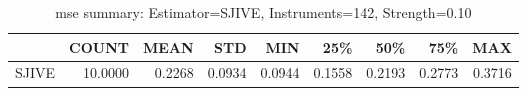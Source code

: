 \begin{table}[ht]
\centering
\caption{mse summary: Estimator=SJIVE, Instruments=142, Strength=0.10}
\begin{tabular}{lrrrrrrrr}
\toprule
 & COUNT & MEAN & STD & MIN & 25\% & 50\% & 75\% & MAX \\
\midrule
SJIVE & 10.0000 & 0.2268 & 0.0934 & 0.0944 & 0.1558 & 0.2193 & 0.2773 & 0.3716 \\
\bottomrule
\end{tabular}
\end{table}
